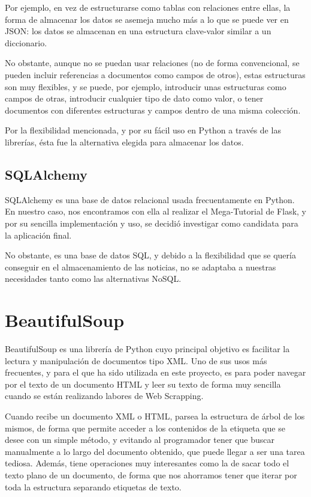 Por ejemplo, en vez de estructurarse como tablas con relaciones entre ellas, la forma de almacenar los datos se asemeja mucho más a lo que se puede ver en JSON: los datos se almacenan en una estructura clave-valor similar a un diccionario. 

No obstante, aunque no se puedan usar relaciones (no de forma convencional, se pueden incluir referencias a documentos como campos de otros), estas estructuras son muy flexibles, y se puede, por ejemplo, introducir unas estructuras como campos de otras, introducir cualquier tipo de dato como valor, o tener documentos con diferentes estructuras y campos dentro de una misma colección.

Por la flexibilidad mencionada, y por su fácil uso en Python a través de las librerías, ésta fue la alternativa elegida para almacenar los datos.

\subsection{SQLAlchemy}

SQLAlchemy \cite{copeland2008essential} es una base de datos relacional usada frecuentamente en Python. En nuestro caso, nos encontramos con ella al realizar el Mega-Tutorial de Flask, y por su sencilla implementación y uso, se decidió investigar como candidata para la aplicación final.

No obstante, es una base de datos SQL, y debido a la flexibilidad que se quería conseguir en el almacenamiento de las noticias, no se adaptaba a nuestras necesidades tanto como las alternativas NoSQL.

\section{BeautifulSoup}

BeautifulSoup \cite{richardson2007beautiful} \cite{beautifulsoup} es una librería de Python cuyo principal objetivo es facilitar la lectura y manipulación de documentos tipo XML. Uno de sus usos más frecuentes, y para el que ha sido utilizada en este proyecto, es para poder navegar por el texto de un documento HTML y leer su texto de forma muy sencilla cuando se están realizando labores de Web Scrapping. 

Cuando recibe un documento XML o HTML, parsea la estructura de árbol de los mismos, de forma que permite acceder a los contenidos de la etiqueta que se desee con un simple método, y evitando al programador tener que buscar manualmente a lo largo del documento obtenido, que puede llegar a ser una tarea tediosa. Además, tiene operaciones muy interesantes como la de sacar todo el texto plano de un documento, de forma que nos ahorramos tener que iterar por toda la estructura separando etiquetas de texto.

